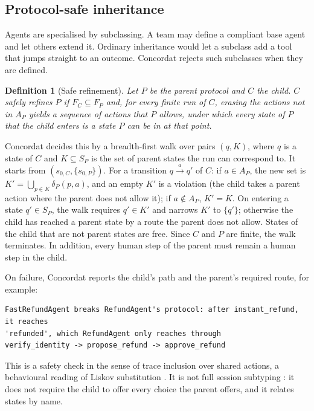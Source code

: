 \documentclass[11pt]{article}
\newtheorem{definition}{Definition}
\begin{document}
\subsection{Protocol-safe inheritance}
\label{sec:inheritance}

Agents are specialised by subclassing. A team may define a compliant base agent and let
others extend it. Ordinary inheritance would let a subclass add a tool that jumps
straight to an outcome. Concordat rejects such subclasses when they are defined.

\begin{definition}[Safe refinement]
Let $P$ be the parent protocol and $C$ the child. $C$ \emph{safely refines} $P$ if
$F_C \subseteq F_P$ and, for every finite run of $C$, erasing the actions not in $A_P$
yields a sequence of actions that $P$ allows, under which every state of $P$ that the
child enters is a state $P$ can be in at that point.
\end{definition}

Concordat decides this by a breadth-first walk over pairs $(q, K)$, where $q$ is a
state of $C$ and $K \subseteq S_P$ is the set of parent states the run can correspond
to. It starts from $(s_{0,C}, \{s_{0,P}\})$. For a transition $q \xrightarrow{a} q'$ of
$C$: if $a \in A_P$, the new set is $K' = \bigcup_{p \in K} \delta_P(p,a)$, and an empty
$K'$ is a violation (the child takes a parent action where the parent does not allow
it); if $a \notin A_P$, $K' = K$. On entering a state $q' \in S_P$, the walk requires
$q' \in K'$ and narrows $K'$ to $\{q'\}$; otherwise the child has reached a parent
state by a route the parent does not allow. States of the child that are not parent
states are free. Since $C$ and $P$ are finite, the walk terminates. In addition, every
human step of the parent must remain a human step in the child.

On failure, Concordat reports the child's path and the parent's required route, for
example:
\begin{lstlisting}[language={},basicstyle=\ttfamily\footnotesize,frame=none]
FastRefundAgent breaks RefundAgent's protocol: after instant_refund, it reaches
'refunded', which RefundAgent only reaches through
verify_identity -> propose_refund -> approve_refund
\end{lstlisting}

This is a safety check in the sense of trace inclusion over shared actions, a
behavioural reading of Liskov substitution \citep{liskov1994behavioral}. It is not full
session subtyping \citep{gay2005subtyping}: it does not require the child to offer every
choice the parent offers, and it relates states by name.
\end{document}
